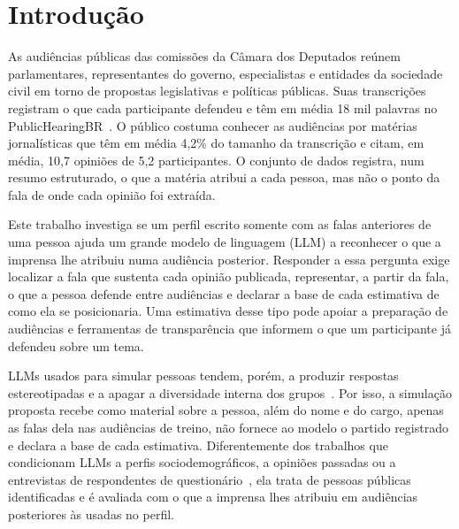 \section{Introdu\c{c}\~ao}
\label{sec:introducao}

As audiências públicas das comissões da Câmara dos Deputados reúnem parlamentares, representantes
do governo, especialistas e entidades da sociedade civil em torno de propostas legislativas e
políticas públicas. Suas transcrições registram o que cada participante defendeu e têm em média 18
mil palavras no PublicHearingBR~\citep{fernandes2024publichearingbr}. O público costuma conhecer as
audiências por matérias jornalísticas que têm em média 4,2\% do tamanho da transcrição e citam, em
média, 10,7 opiniões de 5,2 participantes. O conjunto de dados registra, num resumo estruturado, o
que a matéria atribui a cada pessoa, mas não o ponto da fala de onde cada opinião foi extraída.

Este trabalho investiga se um perfil escrito somente com as falas anteriores de uma pessoa ajuda um
grande modelo de linguagem (LLM) a reconhecer o que a imprensa lhe atribuiu numa audiência
posterior. Responder a essa pergunta exige localizar a fala que sustenta cada opinião publicada,
representar, a partir da fala, o que a pessoa defende entre audiências e declarar a base de cada
estimativa de como ela se posicionaria. Uma estimativa desse tipo pode apoiar a preparação de
audiências e ferramentas de transparência que informem o que um participante já defendeu sobre um
tema.

LLMs usados para simular pessoas tendem, porém, a produzir respostas estereotipadas e a apagar a
diversidade interna dos grupos~\citep{bisbee2024synthetic,wang2025large}. Por isso, a simulação
proposta recebe como material sobre a pessoa, além do nome e do cargo, apenas as falas dela nas
audiências de treino, não fornece ao modelo o partido registrado e declara a base de cada estimativa.
Diferentemente dos trabalhos que condicionam LLMs a perfis sociodemográficos, a opiniões passadas ou
a entrevistas de respondentes de questionário~\citep{argyle2023outofone,hwang2023aligning,park2026llm},
ela trata de pessoas públicas identificadas e é avaliada com o que a imprensa lhes atribuiu em
audiências posteriores às usadas no perfil.


